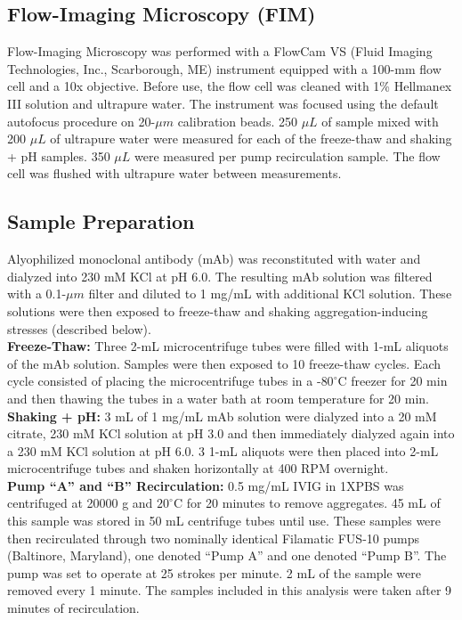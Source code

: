 \documentclass[%
reprint,
superscriptaddress,
 aps,
 pre,
]{revtex4-1}
\begin{document}
\subsection{Flow-Imaging Microscopy (FIM)} 

Flow-Imaging Microscopy was performed with a FlowCam\textsuperscript{\textregistered} VS (Fluid Imaging Technologies, Inc., Scarborough, ME) instrument equipped with a 100-mm flow cell and a 10x objective. Before use, the flow cell was cleaned with 1\%
Hellmanex\textsuperscript{\textregistered} III solution and ultrapure water. The instrument was focused using the default autofocus procedure on 20-$\mu m$ calibration beads. 250 $\mu L$ of sample mixed with 200 $\mu L$  of ultrapure water were measured for each of the freeze-thaw and shaking + pH samples. 350 $\mu L$  were measured per pump recirculation sample. The flow cell was flushed with ultrapure water between measurements.


\subsection{Sample Preparation}
\label{sec:samplePrep}

Alyophilized monoclonal antibody (mAb) was reconstituted with water and dialyzed into 230 mM KCl at pH 6.0. The resulting mAb solution was filtered with a 0.1-$\mu m$ filter and diluted to 1 mg/mL with additional KCl solution. These solutions were then exposed to freeze-thaw and shaking aggregation-inducing stresses (described below). \\


 \noindent \textbf{Freeze-Thaw:} Three 2-mL microcentrifuge tubes were filled with 1-mL aliquots of the mAb solution. Samples were then exposed to 10 freeze-thaw cycles. Each cycle consisted of placing the microcentrifuge tubes in a -$80^\circ$C freezer for 20 min and then thawing the tubes in a water bath at room temperature for 20 min. \\

\noindent \textbf{Shaking + pH:} 3 mL of 1 mg/mL mAb solution were dialyzed into a 20 mM citrate, 230 mM KCl solution at pH 3.0 and then immediately dialyzed again into a 230 mM KCl solution at pH 6.0. 3 1-mL aliquots were then placed into 2-mL microcentrifuge tubes and shaken horizontally at 400 RPM overnight. \\

\noindent \textbf{Pump ``A'' and ``B'' Recirculation:}
0.5 mg/mL IVIG in 1XPBS was centrifuged at 20000 g and $20^\circ$C for 20 minutes to remove aggregates. 45 mL of this sample was stored in 50 mL centrifuge tubes until use. These samples were then recirculated through two nominally identical Filamatic FUS-10 pumps (Baltinore, Maryland), one denoted ``Pump A'' and one denoted ``Pump B''. The pump was set to operate at 25 strokes per minute. 2 mL of the sample were removed every 1 minute. The samples included in this analysis were taken after 9 minutes of recirculation. \\ 
\end{document}
